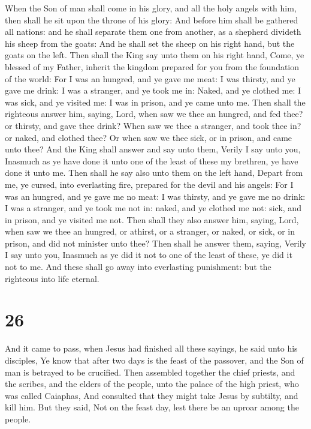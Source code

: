  When the Son of man shall come in his glory, and all the
holy angels with him, then shall he sit upon the throne of his glory:
 And before him shall be gathered all nations: and he shall
separate them one from another, as a shepherd divideth his sheep from
the goats:  And he shall set the sheep on his right hand,
but the goats on the left.  Then shall the King say unto
them on his right hand, Come, ye blessed of my Father, inherit the
kingdom prepared for you from the foundation of the world: 
For I was an hungred, and ye gave me meat: I was thirsty, and ye gave me
drink: I was a stranger, and ye took me in:  Naked, and ye
clothed me: I was sick, and ye visited me: I was in prison, and ye came
unto me.  Then shall the righteous answer him, saying,
Lord, when saw we thee an hungred, and fed thee? or thirsty, and gave
thee drink?  When saw we thee a stranger, and took thee in?
or naked, and clothed thee?  Or when saw we thee sick, or
in prison, and came unto thee?  And the King shall answer
and say unto them, Verily I say unto you, Inasmuch as ye have done it
unto one of the least of these my brethren, ye have done it unto me.
 Then shall he say also unto them on the left hand, Depart
from me, ye cursed, into everlasting fire, prepared for the devil and
his angels:  For I was an hungred, and ye gave me no meat:
I was thirsty, and ye gave me no drink:  I was a stranger,
and ye took me not in: naked, and ye clothed me not: sick, and in
prison, and ye visited me not.  Then shall they also answer
him, saying, Lord, when saw we thee an hungred, or athirst, or a
stranger, or naked, or sick, or in prison, and did not minister unto
thee?  Then shall he answer them, saying, Verily I say unto
you, Inasmuch as ye did it not to one of the least of these, ye did it
not to me.  And these shall go away into everlasting
punishment: but the righteous into life eternal.

\hypertarget{section-25}{%
\section{26}\label{section-25}}

 And it came to pass, when Jesus had finished all these
sayings, he said unto his disciples,  Ye know that after two
days is the feast of the passover, and the Son of man is betrayed to be
crucified.  Then assembled together the chief priests, and
the scribes, and the elders of the people, unto the palace of the high
priest, who was called Caiaphas,  And consulted that they
might take Jesus by subtilty, and kill him.  But they said,
Not on the feast day, lest there be an uproar among the people.

